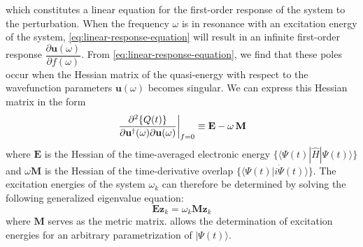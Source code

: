 which constitutes a linear equation for the first-order response of the system
to the perturbation. 
When the frequency $\omega$ is in resonance with an excitation energy of the
system, \cref{eq:linear-response-equation} will result in an infinite
first-order response
\(
    \dfrac{\partial \mathbf{u}(\omega)}{\partial f(\omega)}
\).
From \cref{eq:linear-response-equation}, we find that these poles occur when the
Hessian matrix of the quasi-energy with respect to the wavefunction parameters
\(\mathbf{u}(\omega)\) becomes singular.
We can express this Hessian matrix in the form
\begin{equation}
    \label{eq:quasi-energy-hessian}
    \left.
        \frac{\partial^2\{Q(t)\}}{%
            \partial \mathbf{u}^\dagger(\omega)
            \partial \mathbf{u}(\omega)
        }
    \right|_{f=0}
    \equiv
    \mathbf{E}
    -
    \omega\,
    \mathbf{M}
\end{equation}
where \(\mathbf{E}\) is the Hessian of the time-averaged electronic energy
\(\{\langle\Psi(t)|\hat{H}|\Psi(t)\rangle\}\) and \(\omega\mathbf{M}\) is the
Hessian of the time-derivative overlap
\(\{\langle\Psi(t)|i\dot{\Psi}(t)\rangle\}\).
The excitation energies of the system $\omega_k$ can therefore be determined by
solving the following generalized eigenvalue equation:
\begin{equation}
    \label{eq:linear-response-energy-eigenvalue-equation}
    \mathbf{E}\mathbf{z}_k
    =
    \omega_k
    \mathbf{M}\mathbf{z}_k
\end{equation}
where \(\mathbf{M}\) serves as the metric matrix.
 allows the determination of
excitation energies for an arbitrary parametrization of $|\Psi(t)\rangle$.

